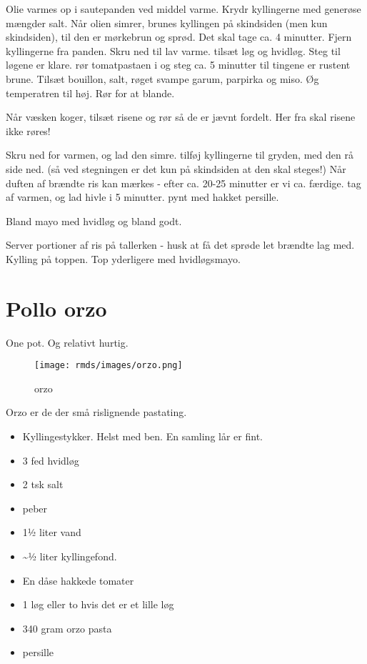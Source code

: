 \documentclass[
  letterpaper,
  DIV=11,
  numbers=noendperiod]{scrreprt}
\providecommand{\tightlist}{%
  \setlength{\itemsep}{0pt}\setlength{\parskip}{0pt}}\usepackage{longtable,booktabs,array}
\begin{document}
Olie varmes op i sautepanden ved middel varme. Krydr kyllingerne med
generøse mængder salt. Når olien simrer, brunes kyllingen på skindsiden
(men kun skindsiden), til den er mørkebrun og sprød. Det skal tage ca. 4
minutter. Fjern kyllingerne fra panden. Skru ned til lav varme. tilsæt
løg og hvidløg. Steg til løgene er klare. rør tomatpastaen i og steg ca.
5 minutter til tingene er rustent brune. Tilsæt bouillon, salt, røget
svampe garum, parpirka og miso. Øg temperatren til høj. Rør for at
blande.

Når væsken koger, tilsæt risene og rør så de er jævnt fordelt. Her fra
skal risene ikke røres!

Skru ned for varmen, og lad den simre. tilføj kyllingerne til gryden,
med den rå side ned. (så ved stegningen er det kun på skindsiden at den
skal steges!) Når duften af brændte ris kan mærkes - efter ca. 20-25
minutter er vi ca. færdige. tag af varmen, og lad hivle i 5 minutter.
pynt med hakket persille.

Bland mayo med hvidløg og bland godt.

Server portioner af ris på tallerken - husk at få det sprøde let brændte
lag med. Kylling på toppen. Top yderligere med hvidløgsmayo.

\hypertarget{pollo-orzo}{%
\section{Pollo orzo}\label{pollo-orzo}}

One pot. Og relativt hurtig.

\begin{figure}

{\centering \texttt{[image: rmds/images/orzo.png]}

}

\caption{orzo}

\end{figure}

Orzo er de der små rislignende pastating.

\begin{itemize}
\tightlist
\item
  Kyllingestykker. Helst med ben. En samling lår er fint.
\item
  3 fed hvidløg
\item
  2 tsk salt
\item
  peber
\item
  1½ liter vand
\item
  \textasciitilde½ liter kyllingefond.
\item
  En dåse hakkede tomater
\item
  1 løg eller to hvis det er et lille løg
\item
  340 gram orzo pasta
\item
  persille
\end{itemize}
\end{document}
